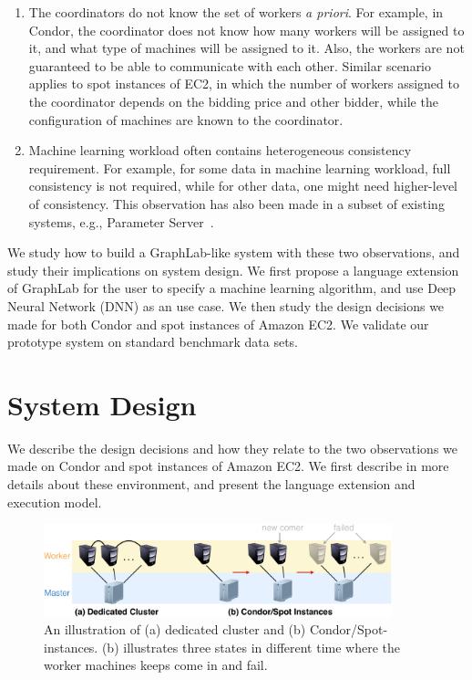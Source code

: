\documentclass[11pt]{article}
\begin{document}
\begin{enumerate}
\item The coordinators do not know the set of workers
{\em a priori}. For example, in Condor, the coordinator
does not know how many workers will be assigned to it, and
what type of machines will be assigned to it. Also, the
workers are not guaranteed to be able to communicate with each
other. Similar scenario applies to spot instances
of EC2, in which the number of workers assigned to the
coordinator depends on the bidding price and other bidder, while
the configuration of machines are known to the coordinator.
\item Machine learning workload often contains heterogeneous
consistency requirement. For example, for some data
in machine learning workload, full consistency is not required,
while for other data, one might need higher-level of consistency.
This observation has also been made in a subset of
existing systems, e.g., Parameter Server~\cite{Li:2014:OSDI}.
\end{enumerate}

We study how to build a GraphLab-like system with these two
observations, and study their implications on system design.
We first propose a language extension of GraphLab for the
user to specify a machine learning algorithm, and use
Deep Neural Network (DNN) as an use case. We then study
the design decisions we made for both Condor and spot
instances of Amazon EC2. We validate our prototype system
on standard benchmark data sets.

\section{System Design}

We describe the design decisions and how they relate to
the two observations we made on Condor and spot
instances of Amazon EC2. We first describe in more details
about these environment, and present the language extension
and execution model.

\begin{figure}[t]
\centering
\includegraphics[width=0.9\textwidth]{figures/env-crop}
\caption{An illustration of (a) dedicated cluster and (b) Condor/Spot-instances. (b) illustrates three states in different time where the worker machines keeps come in and fail.}
\label{fig:env}
\end{figure}
\end{document}

